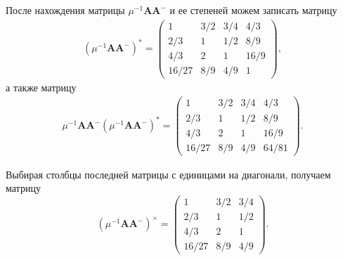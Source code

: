 \documentclass[specialist,
               substylefile = spbu.rtx,
               subf,href,colorlinks=true, 12pt]{disser}
\theoremstyle{definition}
\begin{document}
После нахождения матрицы $\mu^{-1}\bm{A}\bm{A}^{-}$ и ее степеней можем записать матрицу
%
\begin{gather*}
(\mu^{-1}\bm{A}\bm{A}^{-})^{\ast}
=
\left(
\begin{array}{cccc}
1 & 3/2 & 3/4 & 4/3
\\
2/3 & 1 & 1/2 & 8/9
\\
4/3 & 2 & 1 & 16/9
\\
16/27 & 8/9 & 4/9 & 1
\end{array}
\right),
\end{gather*}
а также матрицу
\begin{gather*}
\mu^{-1}\bm{A}\bm{A}^{-}(\mu^{-1}\bm{A}\bm{A}^{-})^{\ast}
=
\left(
\begin{array}{cccc}
1 & 3/2 & 3/4 & 4/3
\\
2/3 & 1 & 1/2 & 8/9
\\
4/3 & 2 & 1 & 16/9
\\
16/27 & 8/9 & 4/9 & 64/81
\end{array}
\right).
\end{gather*}


Выбирая столбцы последней матрицы с единицами на диагонали, получаем матрицу
\begin{equation*}
(\mu^{-1}\bm{A}\bm{A}^{-})^{\times}
=
\left(
\begin{array}{cccc}
1 & 3/2 & 3/4 
\\
2/3 & 1 & 1/2 
\\
4/3 & 2 & 1 
\\
16/27 & 8/9 & 4/9 
\end{array}
\right).
\end{equation*}
\end{document}
